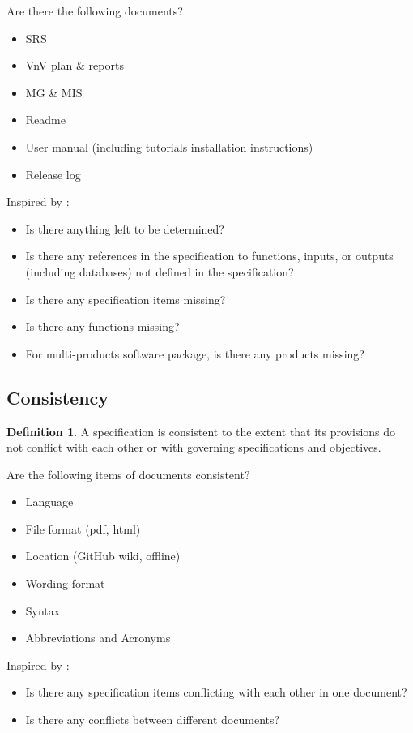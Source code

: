 \documentclass{article}
\theoremstyle{definition}
\newtheorem{defn}{Definition}
\begin{document}
Are there the following documents?
\begin{itemize}
\item SRS
\item VnV plan \& reports
\item MG \& MIS
\item Readme
\item User manual (including tutorials installation instructions) 
\item Release log
\end{itemize}
Inspired by \citep{Boehm1984}:
\begin{itemize}
\item Is there anything left to be determined?
\item Is there any references in the specification to functions, inputs, or
outputs (including databases) not defined in the specification?
\item Is there any specification items missing?
\item Is there any functions missing?
\item For multi-products software package, is there any products missing?
\end{itemize}

\subsection{Consistency}
\begin{defn}
A specification is consistent to the extent that its provisions do not conflict
with each other or with governing specifications and objectives.
\end{defn}

Are the following items of documents consistent?
\begin{itemize}
\item Language
\item File format (pdf, html)
\item Location (GitHub wiki, offline)
\item Wording format
\item Syntax
\item Abbreviations and Acronyms
\end{itemize}

Inspired by \citep{Boehm1984}:
\begin{itemize}
\item Is there any specification items conflicting with each other in one
document?
\item Is there any conflicts between different documents?
\end{itemize}
\end{document}
